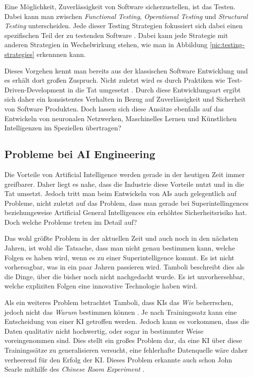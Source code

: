         Eine Möglichkeit, Zuverlässigkeit von Software sicherzustellen, ist das Testen. Dabei kann man zwischen
        \textit{Functional Testing}, \textit{Operational Testing} und \textit{Structural Testing} unterscheiden.
        Jede dieser Testing Strategien fokussiert sich dabei einen spezifischen Teil der zu testenden Software
        \cite[s. 26]{bertolino2019}. Dabei kann jede Strategie mit anderen Strategien in Wechelwirkung stehen, wie man
        in Abbildung \ref{pic:testing-strategies} erkennnen kann.

        Dieses Vorgehen kennt man bereits aus der klassischen Software Entwicklung und es erhält dort großen Zuspruch.
        Nicht zuletzt wird es durch Praktiken wie Test-Driven-Development in die Tat umgesetzt \cite[s. 403]{Kollanus2010}.
        Durch diese Entwicklungsart ergibt sich daher ein konsistentes Verhalten in Bezug auf Zuverlässigkeit und
        Sicherheit von Software Produkten. Doch lassen sich diese Ansätze ebenfalls auf das Entwickeln von
        neuronalen Netzwerken, Maschinelles Lernen und Künstlichen Intelligenzen im Speziellen übertragen?

        \subsection{Probleme bei AI Engineering}
        Die Vorteile von Artificial Intelligence werden gerade in der heutigen Zeit immer greifbarer. Daher liegt es
        nahe, dass die Industrie diese Vorteile nutzt und in die Tat umsetzt. Jedoch tritt man beim Entwickeln von AIs
        auch gelegentlich auf Probleme, nicht zuletzt auf das Problem, dass man gerade bei Superintellingences beziehungsweise
        Artificial General Intelligences ein erhöhtes Sicherheitsrisiko hat. Doch welche Probleme treten im Detail auf?

        Das wohl größte Problem in der aktuellen Zeit und auch noch in den nächsten Jahren, ist wohl die Tatsache, dass
        man nicht genau bestimmen kann, welche Folgen es haben wird, wenn es zu einer Superintelligence kommt.
        \cite[s. 21]{Tamboli2019} Es ist nicht vorhersagbar, was in ein paar Jahren passieren wird. Tamboli beschreibt
        dies als die Dinge, über die bisher noch nicht nachgedacht wurde. Es ist unvorhersehbar, welche expliziten Folgen
        eine innovative Technologie haben wird.

        Als ein weiteres Problem betrachtet Tamboli, dass KIs das \textit{Wie} beherrschen, jedoch nicht das
        \textit{Warum} bestimmen können \cite[s. 24]{Tamboli2019}. Je nach Trainingssatz kann eine Entscheidung von
        einer KI getroffen werden. Jedoch kann es vorkommen, dass die Daten qualitativ nicht hochwertig, oder sogar
        in bestimmter Weise voreingenommen sind. Dies stellt ein großes Problem dar, da eine KI über diese Trainingssätze
        zu generalisieren versucht, eine fehlerhafte Datenquelle wäre daher verheerend für den Erfolg der KI. Dieses
        Problem erkannte auch schon John Searle mithilfe des \textit{Chinese Room Experiment} \cite{cole_2014}.

